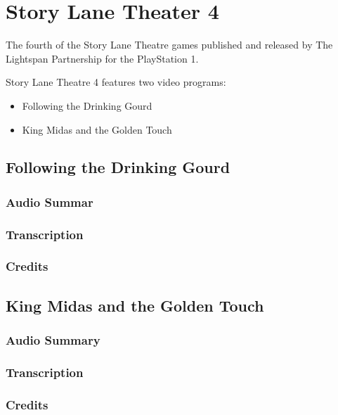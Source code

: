 \chapter{Story Lane Theater 4}


The fourth of the Story Lane Theatre games published and released by The Lightspan Partnership for the PlayStation 1.

Story Lane Theatre 4 features two video programs:

\begin{itemize}
    \item Following the Drinking Gourd
    \item King Midas and the Golden Touch
\end{itemize}

\clearpage
\newpage

\section{Following the Drinking Gourd}

\subsection{Audio Summar}

\subsection{Transcription}

\subsection{Credits}

\section{King Midas and the Golden Touch}

\subsection{Audio Summary}

\subsection{Transcription}

\subsection{Credits}
